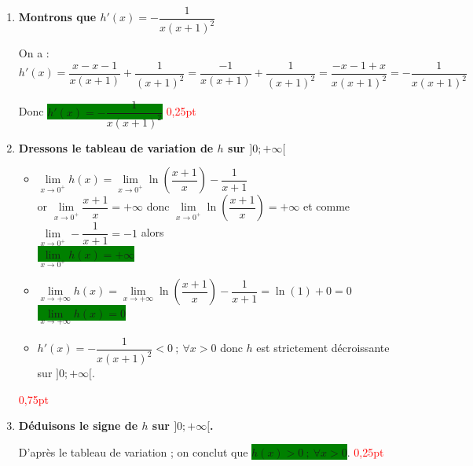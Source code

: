 \documentclass[12pt,a4paper]{article}
\begin{document}
\begin{enumerate}
    \item \textbf{Montrons que $h'(x) = -\dfrac{1}{x(x+1)^2}$}
    
    On a : $h'(x) = \dfrac{x-x-1}{x(x+1)} + \dfrac{1}{(x+1)^2} = \dfrac{-1}{x(x+1)} + \dfrac{1}{(x+1)^2} = \dfrac{-x-1+x}{x(x+1)^2} = -\dfrac{1}{x(x+1)^2}$
    
    Donc \colorbox{green}{$h'(x) = -\dfrac{1}{x(x+1)^2}$} \hfill \textcolor{red}{0,25pt}

    \item \textbf{Dressons le tableau de variation de $h$ sur $]0 ; +\infty[$}
    \begin{itemize}
        \item $\lim\limits_{x \to 0^+} h(x) = \lim\limits_{x \to 0^+} \ln\left(\dfrac{x+1}{x}\right) - \dfrac{1}{x+1}$ \\
        or $\lim\limits_{x \to 0^+} \dfrac{x+1}{x} = +\infty$ donc $\lim\limits_{x \to 0^+} \ln\left(\dfrac{x+1}{x}\right) = +\infty$ et comme $\lim\limits_{x \to 0^+} -\dfrac{1}{x+1} = -1$ alors\\ \colorbox{green}{$\lim\limits_{x \to 0^+} h(x) = +\infty$}
        
        \item $\lim\limits_{x \to +\infty} h(x) = \lim\limits_{x \to +\infty} \ln\left(\dfrac{x+1}{x}\right) - \dfrac{1}{x+1} = \ln(1) + 0 = 0$\\
        \colorbox{green}{$\lim\limits_{x \to +\infty} h(x)=0$}
        \item $h'(x) = -\dfrac{1}{x(x+1)^2} < 0 \ ; \ \forall x > 0$ donc $h$ est strictement décroissante sur $]0 ; +\infty[$.
    \end{itemize}

    \hfill \textcolor{red}{0,75pt}

    \item \textbf{Déduisons le signe de $h$ sur $]0 ; +\infty[$.}
    
    D'après le tableau de variation ; on conclut que \colorbox{green}{$h(x) > 0 \ ; \ \forall x > 0$}. \hfill \textcolor{red}{0,25pt}
\end{enumerate}
\end{document}
